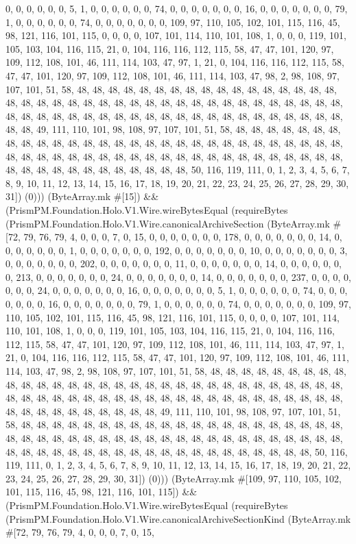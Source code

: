 \documentclass[11pt]{article}
\begin{document}
0, 0, 0, 0, 0, 0, 5, 1, 0, 0, 0, 0, 0, 0, 74, 0, 0, 0, 0, 0, 0, 0, 16, 0, 0, 0, 0, 0, 0, 0, 79, 1, 0, 0, 0, 0, 0, 0, 74, 0, 0, 0, 0, 0, 0, 0, 109, 97, 110, 105, 102, 101, 115, 116, 45, 98, 121, 116, 101, 115, 0, 0, 0, 0, 107, 101, 114, 110, 101, 108, 1, 0, 0, 0, 119, 101, 105, 103, 104, 116, 115, 21, 0, 104, 116, 116, 112, 115, 58, 47, 47, 101, 120, 97, 109, 112, 108, 101, 46, 111, 114, 103, 47, 97, 1, 21, 0, 104, 116, 116, 112, 115, 58, 47, 47, 101, 120, 97, 109, 112, 108, 101, 46, 111, 114, 103, 47, 98, 2, 98, 108, 97, 107, 101, 51, 58, 48, 48, 48, 48, 48, 48, 48, 48, 48, 48, 48, 48, 48, 48, 48, 48, 48, 48, 48, 48, 48, 48, 48, 48, 48, 48, 48, 48, 48, 48, 48, 48, 48, 48, 48, 48, 48, 48, 48, 48, 48, 48, 48, 48, 48, 48, 48, 48, 48, 48, 48, 48, 48, 48, 48, 48, 48, 48, 48, 48, 48, 48, 48, 49, 111, 110, 101, 98, 108, 97, 107, 101, 51, 58, 48, 48, 48, 48, 48, 48, 48, 48, 48, 48, 48, 48, 48, 48, 48, 48, 48, 48, 48, 48, 48, 48, 48, 48, 48, 48, 48, 48, 48, 48, 48, 48, 48, 48, 48, 48, 48, 48, 48, 48, 48, 48, 48, 48, 48, 48, 48, 48, 48, 48, 48, 48, 48, 48, 48, 48, 48, 48, 48, 48, 48, 48, 48, 50, 116, 119, 111, 0, 1, 2, 3, 4, 5, 6, 7, 8, 9, 10, 11, 12, 13, 14, 15, 16, 17, 18, 19, 20, 21, 22, 23, 24, 25, 26, 27, 28, 29, 30, 31]) (0))) (ByteArray.mk \#[15]) \&\& (PrismPM.Foundation.Holo.V1.Wire.wireBytesEqual (requireBytes (PrismPM.Foundation.Holo.V1.Wire.canonicalArchiveSection (ByteArray.mk \#[72, 79, 76, 79, 4, 0, 0, 0, 7, 0, 15, 0, 0, 0, 0, 0, 0, 0, 178, 0, 0, 0, 0, 0, 0, 0, 14, 0, 0, 0, 0, 0, 0, 0, 1, 0, 0, 0, 0, 0, 0, 0, 192, 0, 0, 0, 0, 0, 0, 0, 10, 0, 0, 0, 0, 0, 0, 0, 3, 0, 0, 0, 0, 0, 0, 0, 202, 0, 0, 0, 0, 0, 0, 0, 11, 0, 0, 0, 0, 0, 0, 0, 14, 0, 0, 0, 0, 0, 0, 0, 213, 0, 0, 0, 0, 0, 0, 0, 24, 0, 0, 0, 0, 0, 0, 0, 14, 0, 0, 0, 0, 0, 0, 0, 237, 0, 0, 0, 0, 0, 0, 0, 24, 0, 0, 0, 0, 0, 0, 0, 16, 0, 0, 0, 0, 0, 0, 0, 5, 1, 0, 0, 0, 0, 0, 0, 74, 0, 0, 0, 0, 0, 0, 0, 16, 0, 0, 0, 0, 0, 0, 0, 79, 1, 0, 0, 0, 0, 0, 0, 74, 0, 0, 0, 0, 0, 0, 0, 109, 97, 110, 105, 102, 101, 115, 116, 45, 98, 121, 116, 101, 115, 0, 0, 0, 0, 107, 101, 114, 110, 101, 108, 1, 0, 0, 0, 119, 101, 105, 103, 104, 116, 115, 21, 0, 104, 116, 116, 112, 115, 58, 47, 47, 101, 120, 97, 109, 112, 108, 101, 46, 111, 114, 103, 47, 97, 1, 21, 0, 104, 116, 116, 112, 115, 58, 47, 47, 101, 120, 97, 109, 112, 108, 101, 46, 111, 114, 103, 47, 98, 2, 98, 108, 97, 107, 101, 51, 58, 48, 48, 48, 48, 48, 48, 48, 48, 48, 48, 48, 48, 48, 48, 48, 48, 48, 48, 48, 48, 48, 48, 48, 48, 48, 48, 48, 48, 48, 48, 48, 48, 48, 48, 48, 48, 48, 48, 48, 48, 48, 48, 48, 48, 48, 48, 48, 48, 48, 48, 48, 48, 48, 48, 48, 48, 48, 48, 48, 48, 48, 48, 48, 49, 111, 110, 101, 98, 108, 97, 107, 101, 51, 58, 48, 48, 48, 48, 48, 48, 48, 48, 48, 48, 48, 48, 48, 48, 48, 48, 48, 48, 48, 48, 48, 48, 48, 48, 48, 48, 48, 48, 48, 48, 48, 48, 48, 48, 48, 48, 48, 48, 48, 48, 48, 48, 48, 48, 48, 48, 48, 48, 48, 48, 48, 48, 48, 48, 48, 48, 48, 48, 48, 48, 48, 48, 48, 50, 116, 119, 111, 0, 1, 2, 3, 4, 5, 6, 7, 8, 9, 10, 11, 12, 13, 14, 15, 16, 17, 18, 19, 20, 21, 22, 23, 24, 25, 26, 27, 28, 29, 30, 31]) (0))) (ByteArray.mk \#[109, 97, 110, 105, 102, 101, 115, 116, 45, 98, 121, 116, 101, 115]) \&\& (PrismPM.Foundation.Holo.V1.Wire.wireBytesEqual (requireBytes (PrismPM.Foundation.Holo.V1.Wire.canonicalArchiveSectionKind (ByteArray.mk \#[72, 79, 76, 79, 4, 0, 0, 0, 7, 0, 15, 
\end{document}
